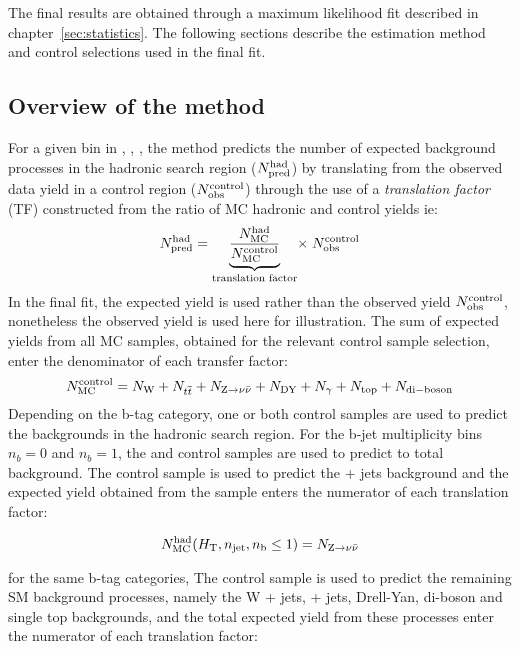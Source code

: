 The final results are obtained through a maximum likelihood fit described
in chapter~\ref{sec:statistics}. The following sections describe 
the estimation method and control selections used in the final fit.

\subsection{Overview of the method\label{sec:background-method}}

For a given bin in \scalht, \njet, \nb, the method predicts the number 
of expected background processes in the hadronic search region ($N_{\textrm{pred}}^{\rm  had}$) 
by translating from the observed data yield in a control region 
($N_{\textrm{obs}}^{\rm  control}$) through the use of a {\it translation factor} 
(TF) constructed from the ratio of MC hadronic and control yields ie:
\begin{equation}
  \label{equ:pred-method}
  N_{\textrm{pred}}^{\rm had} = \underbrace{\frac{N_{\rm MC}^{\rm
      had}}{N_{\rm MC}^{\rm
      control}}}_\text{translation factor}\! \times \; N_{\textrm{obs}}^{\rm
    control}   
\end{equation}
In the ﬁnal ﬁt, the expected yield is used rather than the observed yield
$N_{\textrm{obs}}^{\rm  control}$, nonetheless the observed yield is used here for 
illustration. The sum of expected yields from all MC samples, obtained for the
relevant control sample selection, enter the denominator of each
transfer factor:
\begin{equation}
  \label{equ:ratio-denom}
  N_{\rm MC}^{\rm control} = N_{\rm W} + N_{\relax{t}\overline{\relax{t}}} + N_{{\text Z} \rightarrow \nu\bar{\nu}} +
N_{\rm DY} + N_{\gamma} + N_{\rm top} + N_{\rm di-boson}
\end{equation}
Depending on the b-tag category, one or both control samples are used 
to predict the backgrounds in the hadronic search region. For the b-jet 
multiplicity bins $n_b = 0$ and $n_b = 1$, the \mj and \gj control samples 
are used to predict to total background. The \gj control
sample is used to predict the \znunu + jets background and the expected yield
obtained from the \znunu sample enters the numerator of each translation
factor:

\begin{equation}
  \label{equ:ratio-numer-gj}
  N_{\rm MC}^{\rm had}(\mbox{$H_\text{T}$},n_{\text{jet}},n_{\text{b}} \leq 1) = N_{{\text Z} \rightarrow \nu\bar{\nu}}
\end{equation}

for the same b-tag categories, The \mj control sample is used to predict 
the remaining SM background processes, namely the W + jets, \ttbar + jets,
Drell-Yan, di-boson and single top backgrounds, and the total expected yield
from these processes enter the numerator of each translation factor:

